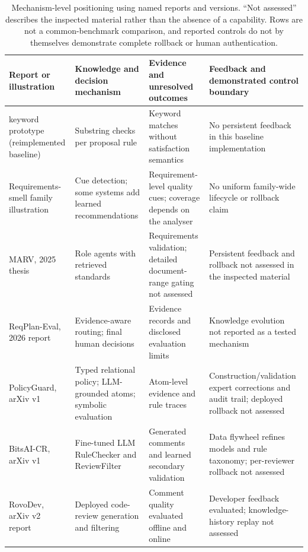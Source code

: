 \documentclass[computers,article,submit,moreauthors]{Definitions/mdpi}
\begin{document}
\begin{table}[!ht]
\caption{Mechanism-level positioning using named reports and versions. ``Not assessed'' describes the inspected material rather than the absence of a capability. Rows are not a common-benchmark comparison, and reported controls do not by themselves demonstrate complete rollback or human authentication.}
\label{tab:positioning}
\centering
\footnotesize
\setlength{\tabcolsep}{3pt}
\begin{tabularx}{\textwidth}{@{}>{\raggedright\arraybackslash}p{2.6cm}>{\raggedright\arraybackslash}X>{\raggedright\arraybackslash}X>{\raggedright\arraybackslash}X@{}}
\toprule
Report or illustration & Knowledge and decision mechanism & Evidence and unresolved outcomes & Feedback and demonstrated control boundary \\
\midrule
2025 keyword prototype (reimplemented baseline) & Substring checks per proposal rule & Keyword matches without satisfaction semantics & No persistent feedback in this baseline implementation \\
Requirements-smell family illustration~\cite{femmer2017,smell2024,airreq2025} & Cue detection; some systems add learned recommendations & Requirement-level quality cues; coverage depends on the analyser & No uniform family-wide lifecycle or rollback claim \\
MARV, 2025 thesis~\cite{chinnam2025} & Role agents with retrieved standards & Requirements validation; detailed document-range gating not assessed & Persistent feedback and rollback not assessed in the inspected material \\
ReqPlan-Eval, 2026 report~\cite{alsawalqah2026} & Evidence-aware routing; final human decisions & Evidence records and disclosed evaluation limits & Knowledge evolution not reported as a tested mechanism \\
PolicyGuard, arXiv v1~\cite{malik2026} & Typed relational policy; LLM-grounded atoms; symbolic evaluation & Atom-level evidence and rule traces & Construction/validation expert corrections and audit trail; deployed rollback not assessed \\
BitsAI-CR, arXiv v1~\cite{sun2025} & Fine-tuned LLM RuleChecker and ReviewFilter & Generated comments and learned secondary validation & Data flywheel refines models and rule taxonomy; per-reviewer rollback not assessed \\
RovoDev, arXiv v2 report~\cite{rovo2026} & Deployed code-review generation and filtering & Comment quality evaluated offline and online & Developer feedback evaluated; knowledge-history replay not assessed \\

\end{tabularx}
\end{table}
\end{document}
